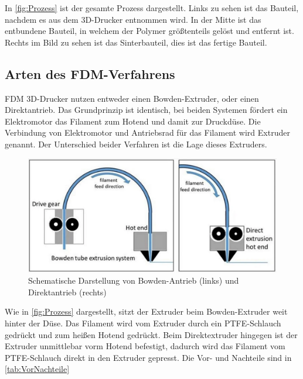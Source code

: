 In \autoref{fig:Prozess} ist der gesamte Prozess dargestellt. Links zu sehen ist das Bauteil, nachdem es aus dem 3D-Drucker entnommen wird. In der Mitte ist das entbundene Bauteil, in welchem der Polymer größtenteils gelöst und entfernt ist. Rechts im Bild zu sehen ist das Sinterbauteil, dies ist das fertige Bauteil.

\subsection{Arten des FDM-Verfahrens}

FDM 3D-Drucker nutzen entweder einen Bowden-Extruder, oder einen Direktantrieb. Das Grundprinzip ist identisch, bei beiden Systemen fördert ein Elektromotor das Filament zum Hotend und damit zur Druckdüse. Die Verbindung von Elektromotor und Antriebsrad für das Filament wird Extruder genannt. Der Unterschied beider Verfahren ist die Lage dieses Extruders.

\begin{figure}[h]
	\centering
	\includegraphics[width=0.8\linewidth]{bilder/img_BowdenvsDrirect.png}
        \caption[Schematische Darstellung von Bowden-Antrieb (links) und Direktantrieb (rechts)] {Schematische Darstellung von Bowden-Antrieb (links) und Direktantrieb (rechts) \autocite{facfox}}
	\label{fig:Prozess}
\end{figure}

Wie in \autoref{fig:Prozess} dargestellt, sitzt der Extruder beim Bowden-Extruder weit hinter der Düse. Das Filament wird vom Extruder durch ein PTFE-Schlauch gedrückt und zum heißen Hotend gedrückt. Beim Direktextruder hingegen ist der Extruder unmittlebar vorm Hotend befestigt, dadurch wird das Filament vom PTFE-Schlauch direkt in den Extruder gepresst. Die Vor- und Nachteile sind in \autoref{tab:VorNachteile}

